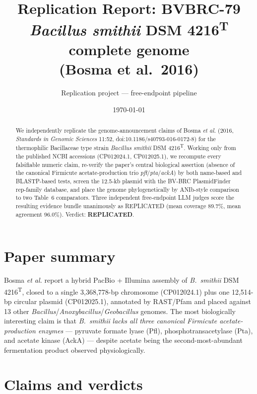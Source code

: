 \documentclass[11pt]{article}
\title{Replication Report: BVBRC-79 \\ \textit{Bacillus smithii} DSM 4216\textsuperscript{T} complete genome \\ (Bosma et al.\ 2016)}
\author{Replication project --- free-endpoint pipeline}
\date{\today}
\begin{document}
\maketitle

\begin{abstract}
We independently replicate the genome-announcement claims of Bosma \textit{et al.} (2016, \textit{Standards in Genomic Sciences} 11:52, doi:10.1186/s40793-016-0172-8) for the thermophilic Bacillaceae type strain \textit{Bacillus smithii} DSM 4216\textsuperscript{T}. Working only from the published NCBI accessions (CP012024.1, CP012025.1), we recompute every falsifiable numeric claim, re-verify the paper's central biological assertion (absence of the canonical Firmicute acetate-production trio \textit{pfl}/\textit{pta}/\textit{ackA}) by both name-based and BLASTP-based tests, screen the 12.5-kb plasmid with the BV-BRC PlasmidFinder rep-family database, and place the genome phylogenetically by ANIb-style comparison to two Table~6 comparators. Three independent free-endpoint LLM judges score the resulting evidence bundle unanimously as \textsc{REPLICATED} (mean coverage 89.7\%, mean agreement 96.0\%). Verdict: \textbf{REPLICATED}.
\end{abstract}

\section{Paper summary}

Bosma \textit{et al.} report a hybrid PacBio + Illumina assembly of \textit{B.\ smithii} DSM 4216\textsuperscript{T}, closed to a single 3{,}368{,}778-bp chromosome (CP012024.1) plus one 12{,}514-bp circular plasmid (CP012025.1), annotated by RAST/Pfam and placed against 13 other \textit{Bacillus}/\textit{Anoxybacillus}/\textit{Geobacillus} genomes. The most biologically interesting claim is that \textit{B.\ smithii} \emph{lacks all three canonical Firmicute acetate-production enzymes} --- pyruvate formate lyase (Pfl), phosphotransacetylase (Pta), and acetate kinase (AckA) --- despite acetate being the second-most-abundant fermentation product observed physiologically.

\section{Claims and verdicts}
\end{document}
